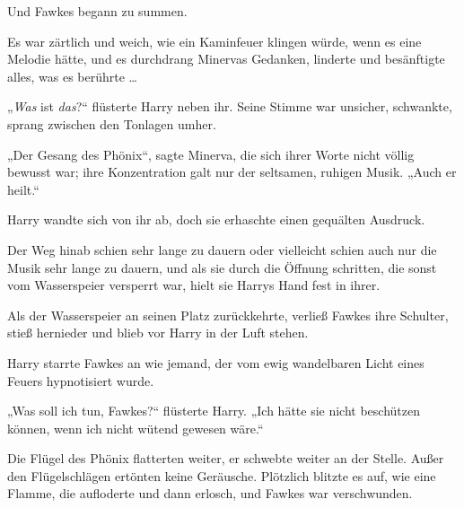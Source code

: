 Und Fawkes begann zu summen.

Es war zärtlich und weich, wie ein Kaminfeuer klingen würde, wenn es eine Melodie hätte, und es durchdrang Minervas Gedanken, linderte und besänftigte alles, was es berührte …

„\emph{Was} ist \emph{das}?“ flüsterte Harry neben ihr. Seine Stimme war unsicher, schwankte, sprang zwischen den Tonlagen umher.

„Der Gesang des Phönix“, sagte Minerva, die sich ihrer Worte nicht völlig bewusst war; ihre Konzentration galt nur der seltsamen, ruhigen Musik.
„Auch er heilt.“

Harry wandte sich von ihr ab, doch sie erhaschte einen gequälten Ausdruck.

Der Weg hinab schien sehr lange zu dauern oder vielleicht schien auch nur die Musik sehr lange zu dauern, und als sie durch die Öffnung schritten, die sonst vom Wasserspeier versperrt war, hielt sie Harrys Hand fest in ihrer.

Als der Wasserspeier an seinen Platz zurückkehrte, verließ Fawkes ihre Schulter, stieß hernieder und blieb vor Harry in der Luft stehen.

Harry starrte Fawkes an wie jemand, der vom ewig wandelbaren Licht eines Feuers hypnotisiert wurde.

„Was soll ich tun, Fawkes?“ flüsterte Harry.
„Ich hätte sie nicht beschützen können, wenn ich nicht wütend gewesen wäre.“

Die Flügel des Phönix flatterten weiter, er schwebte weiter an der Stelle. Außer den Flügelschlägen ertönten keine Geräusche. Plötzlich blitzte es auf, wie eine Flamme, die aufloderte und dann erlosch, und Fawkes war verschwunden.

